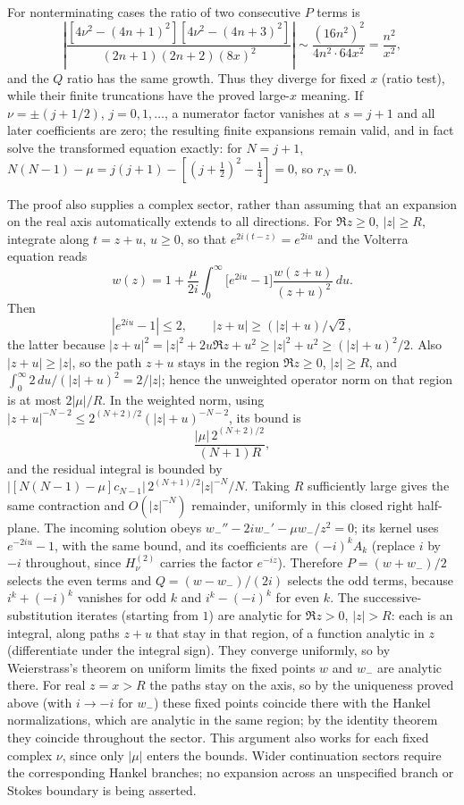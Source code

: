 For nonterminating cases the ratio of two consecutive $P$ terms is
\[
\left|\frac{[4\nu^2-(4n+1)^2][4\nu^2-(4n+3)^2]}
{(2n+1)(2n+2)(8x)^2}\right|\sim\frac{(16n^2)^2}{4n^2\cdot64x^2}
=\frac{n^2}{x^2},
\]
and the $Q$ ratio has the same growth. Thus they diverge for fixed $x$
(ratio test), while their finite truncations have the proved large-$x$
meaning. If $\nu=\pm(j+1/2)$, $j=0,1,\ldots$, a numerator factor
vanishes at $s=j+1$ and all later coefficients are zero; the resulting
finite expansions remain valid, and in fact solve the transformed
equation exactly: for $N=j+1$,
$N(N-1)-\mu=j(j+1)-[(j+\frac12)^2-\frac14]=0$, so $r_N=0$.

The proof also supplies a complex sector, rather than assuming that an
expansion on the real axis automatically extends to all directions.
For $\Re z\ge0$, $|z|\ge R$, integrate along $t=z+u$, $u\ge0$, so that
$e^{2i(t-z)}=e^{2iu}$ and the Volterra equation reads
\[
w(z)=1+\frac\mu{2i}\int_0^\infty\bigl[e^{2iu}-1\bigr]
\frac{w(z+u)}{(z+u)^2}\,du.
\]
Then
\[
|e^{2iu}-1|\le2,\qquad
|z+u|\ge (|z|+u)/\sqrt2,
\]
the latter because $|z+u|^2=|z|^2+2u\Re z+u^2\ge|z|^2+u^2
\ge(|z|+u)^2/2$. Also $|z+u|\ge|z|$, so the path $z+u$ stays in the
region $\Re z\ge0$, $|z|\ge R$, and
$\int_0^\infty2\,du/(|z|+u)^2=2/|z|$; hence the unweighted operator norm
on that region is at most $2|\mu|/R$. In the weighted norm, using
$|z+u|^{-N-2}\le2^{(N+2)/2}(|z|+u)^{-N-2}$, its bound is
\[
\frac{|\mu|\,2^{(N+2)/2}}{(N+1)R},
\]
and the residual integral is bounded by
$|[N(N-1)-\mu]c_{N-1}|\,2^{(N+1)/2}|z|^{-N}/N$.
Taking $R$ sufficiently large gives the same contraction and
$O(|z|^{-N})$ remainder, uniformly in this closed right half-plane.
The incoming solution obeys $w_-''-2iw_-'-\mu w_-/z^2=0$; its kernel
uses $e^{-2iu}-1$, with the same bound, and its coefficients are
$(-i)^kA_k$ (replace $i$ by $-i$ throughout, since $H^{(2)}_\nu$
carries the factor $e^{-iz}$). Therefore $P=(w+w_-)/2$ selects the even
terms and $Q=(w-w_-)/(2i)$ selects the odd terms, because
$i^k+(-i)^k$ vanishes for odd $k$ and $i^k-(-i)^k$ for even $k$.
The successive-substitution iterates (starting from $1$) are analytic
for $\Re z>0$, $|z|>R$: each is an integral, along paths $z+u$ that
stay in that region, of a function analytic in $z$ (differentiate under
the integral sign). They converge uniformly, so by Weierstrass's theorem
on uniform limits the fixed points $w$ and $w_-$ are analytic there.
For real $z=x>R$ the paths stay on the axis, so by the uniqueness
proved above (with $i\to-i$ for $w_-$) these fixed points coincide
there with the Hankel normalizations, which are analytic in the same
region; by the identity theorem they coincide throughout the sector.
This argument also works for each fixed complex $\nu$, since only
$|\mu|$ enters the bounds. Wider continuation sectors require
the corresponding Hankel branches; no expansion across an unspecified
branch or Stokes boundary is being asserted.

